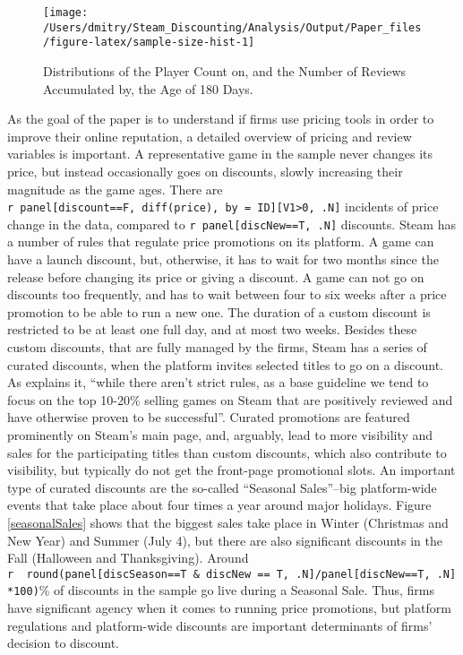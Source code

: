 \documentclass[
  12pt,
  pagebackref]{article}
\begin{document}
\begin{figure}[h]

{\centering \texttt{[image: /Users/dmitry/Steam\_Discounting/Analysis/Output/Paper\_files/figure-latex/sample-size-hist-1]} 

}

\caption{\label{sampleSizeHist} Distributions of the Player Count on, and the Number of Reviews Accumulated by, the Age of 180 Days.}\label{fig:sample-size-hist}
\end{figure}

As the goal of the paper is to understand if firms use pricing tools in
order to improve their online reputation, a detailed overview of pricing
and review variables is important. A representative game in the sample
never changes its price, but instead occasionally goes on discounts,
slowly increasing their magnitude as the game ages. There are
\texttt{r\ panel{[}discount==F,\ diff(price),\ by\ =\ ID{]}{[}V1\textgreater{}0,\ .N{]}}
incidents of price change in the data, compared to
\texttt{r\ panel{[}discNew==T,\ .N{]}} discounts. Steam has a number of
rules that regulate price promotions on its platform. A game can have a
launch discount, but, otherwise, it has to wait for two months since the
release before changing its price or giving a discount. A game can not
go on discounts too frequently, and has to wait between four to six
weeks after a price promotion to be able to run a new one. The duration
of a custom discount is restricted to be at least one full day, and at
most two weeks. Besides these custom discounts, that are fully managed
by the firms, Steam has a series of curated discounts, when the platform
invites selected titles to go on a discount. As \citet{steamDiscounting}
explains it, ``while there aren't strict rules, as a base guideline we
tend to focus on the top 10-20\% selling games on Steam that are
positively reviewed and have otherwise proven to be successful''.
Curated promotions are featured prominently on Steam's main page, and,
arguably, lead to more visibility and sales for the participating titles
than custom discounts, which also contribute to visibility, but
typically do not get the front-page promotional slots. An important type
of curated discounts are the so-called ``Seasonal Sales''--big
platform-wide events that take place about four times a year around
major holidays. Figure \ref{seasonalSales} shows that the biggest sales
take place in Winter (Christmas and New Year) and Summer (July 4), but
there are also significant discounts in the Fall (Halloween and
Thanksgiving). Around
\texttt{r\ \ round(panel{[}discSeason==T\ \&\ discNew\ ==\ T,\ .N{]}/panel{[}discNew==T,\ .N{]}*100)}\%
of discounts in the sample go live during a Seasonal Sale. Thus, firms
have significant agency when it comes to running price promotions, but
platform regulations and platform-wide discounts are important
determinants of firms' decision to discount.
\end{document}
